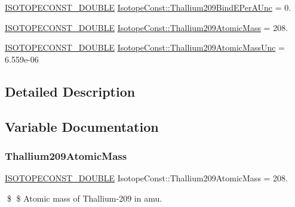 \begin{DoxyCompactItemize}
\mbox{\hyperlink{group___isotope_const-_macros_ga8f45a7272ce02c0b4c65c44636ed719a}{I\+S\+O\+T\+O\+P\+E\+C\+O\+N\+S\+T\+\_\+\+D\+O\+U\+B\+LE}} \mbox{\hyperlink{group___isotope_const-_thallium-_tl209_ga62ea01fef86244bb5ceebc7428c107ba}{Isotope\+Const\+::\+Thallium209\+Bind\+E\+Per\+A\+Unc}} = 0.
\item 
\mbox{\hyperlink{group___isotope_const-_macros_ga8f45a7272ce02c0b4c65c44636ed719a}{I\+S\+O\+T\+O\+P\+E\+C\+O\+N\+S\+T\+\_\+\+D\+O\+U\+B\+LE}} \mbox{\hyperlink{group___isotope_const-_thallium-_tl209_gafb85917879de0b83e4bc667431793275}{Isotope\+Const\+::\+Thallium209\+Atomic\+Mass}} = 208.
\item 
\mbox{\hyperlink{group___isotope_const-_macros_ga8f45a7272ce02c0b4c65c44636ed719a}{I\+S\+O\+T\+O\+P\+E\+C\+O\+N\+S\+T\+\_\+\+D\+O\+U\+B\+LE}} \mbox{\hyperlink{group___isotope_const-_thallium-_tl209_ga9db5cfc4c73bb7071fd47f76adfcab16}{Isotope\+Const\+::\+Thallium209\+Atomic\+Mass\+Unc}} = 6.\+559e-\/06
\end{DoxyCompactItemize}


\subsection{Detailed Description}


\subsection{Variable Documentation}
\mbox{\label{group___isotope_const-_thallium-_tl209_gafb85917879de0b83e4bc667431793275}} 
\subsubsection{\texorpdfstring{Thallium209\+Atomic\+Mass}{Thallium209AtomicMass}}
{\footnotesize\ttfamily \mbox{\hyperlink{group___isotope_const-_macros_ga8f45a7272ce02c0b4c65c44636ed719a}{I\+S\+O\+T\+O\+P\+E\+C\+O\+N\+S\+T\+\_\+\+D\+O\+U\+B\+LE}} Isotope\+Const\+::\+Thallium209\+Atomic\+Mass = 208.}

\$ \$ Atomic mass of Thallium-\/209 in amu. \mbox{\label{group___isotope_const-_thallium-_tl209_ga9db5cfc4c73bb7071fd47f76adfcab16}} 
